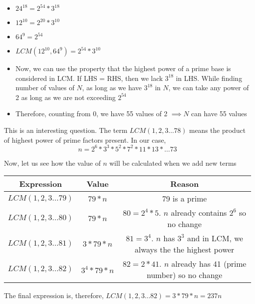 
\begin{itemize}
    \item $24^{18} = 2^{54} * 3^{18}$
    \item $12^{10} = 2^{20} * 3^{10}$
    \item $64^9 = 2^{54}$
    \item $LCM(12^{10},64^9) = 2^{54} * 3^{10}$
    \item Now, we can use the property that the highest power of a prime base is considered in LCM. If LHS = RHS, then we lack $3^{18}$ in LHS. While finding number of values of $N$, as long as we have $3^{18}$ in $N$, we can take any power of 2 as long as we are not exceeding $2^{54}$
    \item Therefore, counting from 0, we have 55 values of 2 $\implies N$ can have 55 values 
\end{itemize}


This is an interesting question. The term $LCM(1,2,3 \ldots 78)$ means the product of highest power of prime factors present. In our case,
$$
n = 2^6 * 3^3 * 5^2 * 7^2 * 11 * 13 * \ldots 73
$$

Now, let us see how the value of $n$ will be calculated when we add new terms
\begin{table}[]
    \centering
    \begin{tabular}{|| c | c | c ||}
        \hline
         Expression & Value & Reason \\
        \hline
         $LCM(1,2,3 \ldots 79) $ & $79 * n$ & 79 is a prime \\
        \hline
         $LCM(1,2,3 \ldots 80) $ & $79 * n$ & $80 = 2^4 * 5$. $n$ already contains $2^6$ so no change \\
        \hline
         $LCM(1,2,3 \ldots 81) $ & $3 * 79 * n$ & $81 = 3^4$. $n$ has $3^3$ and in LCM, we always the the highest power \\
        \hline
         $LCM(1,2,3 \ldots 82) $ & $3^4 * 79 * n$ & $82 = 2 * 41$. $n$ already has 41 (prime number) so no change \\
        \hline
    \end{tabular}
\end{table}

The final expression is, therefore, $LCM(1,2,3 \ldots 82) = 3 * 79 * n = 237n$

